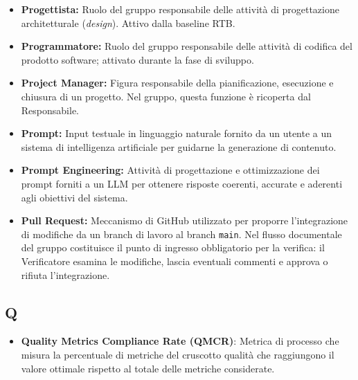 \begin{itemize}[leftmargin=*]
            superiore invalicabile durante lo svolgimento del progetto.
      \item \textbf{Progettista:} Ruolo del gruppo responsabile delle attività di
            progettazione architetturale (\textit{design}). Attivo dalla baseline RTB.
      \item \textbf{Programmatore:} Ruolo del gruppo responsabile delle attività di
            codifica del prodotto software; attivato durante la fase di sviluppo.
      \item \textbf{Project Manager:} Figura responsabile della pianificazione, esecuzione e chiusura di un progetto. Nel gruppo, questa funzione è ricoperta dal Responsabile.
      \item \textbf{Prompt:} Input testuale in linguaggio naturale fornito da un
            utente a un sistema di intelligenza artificiale per guidarne la
            generazione di contenuto.
      \item \textbf{Prompt Engineering:} Attività di progettazione e ottimizzazione dei prompt forniti a un LLM per ottenere risposte coerenti, accurate e aderenti agli obiettivi del sistema.
      \item \textbf{Pull Request:} Meccanismo di GitHub utilizzato per proporre
          l'integrazione di modifiche da un branch di lavoro al branch
          \texttt{main}. Nel flusso documentale del gruppo costituisce il punto
          di ingresso obbligatorio per la verifica: il Verificatore esamina le
          modifiche, lascia eventuali commenti e approva o rifiuta l'integrazione.
\end{itemize}
 
{}
\subsection*{Q}
\begin{itemize}
      \item \textbf{Quality Metrics Compliance Rate (QMCR)}: Metrica di processo che misura
      la percentuale di metriche del cruscotto qualità che raggiungono il valore
      ottimale rispetto al totale delle metriche considerate.
\end{itemize}
 
{}
